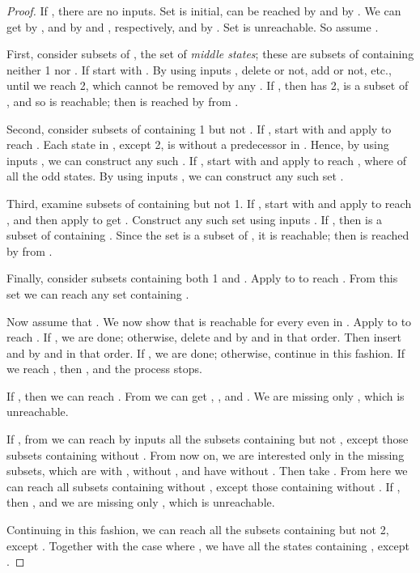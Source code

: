 \documentclass{llncs}
\begin{document}
\begin{proof}
If , there are no  inputs. Set   is initial,  can be reached by  and  by .
We can get  by  ,   and   by  and , respectively, and   by . 
Set  is unreachable. So assume .

First, consider subsets  of , the set of \emph{middle states}; these are subsets of  containing neither 1 nor . If  start with
. 
By using inputs , delete  or not, add  or not, etc., until we reach 2, which cannot be removed by any .
If , then    has 2, is a subset of , and so is reachable; then  is reached  by   from .


Second, consider subsets  of  containing 1 but not .
If , start with  and apply  to reach . 
Each state in , except  2, is without a predecessor in .
Hence, by using  inputs , we can construct any such  .
If ,
start with  and apply  to reach , where  of all the odd states.
By using inputs , we can construct any such set .



Third,  examine subsets  of  containing  but not 1.
If , start with  and apply  to reach , and then apply  to get .
Construct any such set  using inputs .
If , then   is a subset of  containing . 
Since the set    is a subset of , it is reachable; then  is reached  by   from .


Finally, consider subsets  containing both 1 and .
Apply  to  to reach . From this set we can reach any set containing .

Now assume that .
We now show that  is reachable for every even  in .
Apply  to  to reach .
 If , we are done; otherwise, delete  and  by  and  in that order. Then insert  and  by  and  in that order.
 If , we are done; otherwise,  continue in this fashion.
If we reach , then , and the process stops. 

If , then we can reach .
From  we can get , , and .
We are missing only  , which is unreachable.





If , from  we can reach by  inputs all the subsets containing    but not , except those subsets containing  without .
From now on,  we are interested only in the missing subsets, which are with , without , and have  without .
Then take . 
From here we can reach all subsets containing    without , except those containing  without . If , then , and we are missing only 
, which is unreachable.

Continuing in this fashion, we can reach all the subsets containing 
 but not 2, except . Together with the case where , we have all the states containing ,  except .




\end{proof}
\end{document}

